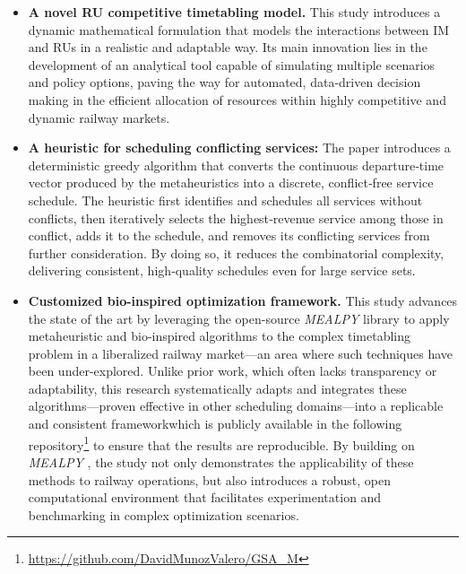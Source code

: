 \documentclass[Afour,sagev,times]{sagej}
\begin{document}
\begin{itemize}
  \item \textbf{A novel \gls{RU} competitive timetabling model.} This study introduces a dynamic mathematical formulation that models the interactions between \gls{IM} and \glspl{RU} in a realistic and adaptable way. Its main innovation lies in the development of an analytical tool capable of simulating multiple scenarios and policy options, paving the way for automated, data-driven decision making in the efficient allocation of resources within highly competitive and dynamic railway markets.

  \item \textbf{A heuristic for scheduling conflicting services: } The paper introduces a deterministic greedy algorithm that converts the continuous departure‐time vector produced by the metaheuristics into a discrete, conflict‐free service schedule. The heuristic first identifies and schedules all services without conflicts, then iteratively selects the highest‐revenue service among those in conflict, adds it to the schedule, and removes its conflicting services from further consideration. By doing so, it reduces the combinatorial complexity, delivering consistent, high‐quality schedules even for large service sets.
  

  \item \textbf{Customized bio-inspired optimization framework.} This study advances the state of the art by leveraging the open-source \textit{MEALPY} library to apply metaheuristic and bio-inspired algorithms to the complex timetabling problem in a liberalized railway market—an area where such techniques have been under-explored. Unlike prior work, which often lacks transparency or adaptability, this research systematically adapts and integrates these algorithms—proven effective in other scheduling domains—into a replicable and consistent frameworkwhich is publicly available in the following repository\footnote{\url{https://github.com/DavidMunozValero/GSA_M}} to ensure that the results are reproducible. By building on \textit{MEALPY} \cite{Vanthieu2023,Vanthieu2023b}, the study not only demonstrates the applicability of these methods to railway operations, but also introduces a robust, open computational environment that facilitates experimentation and benchmarking in complex optimization scenarios.
  

\end{itemize}
\end{document}
